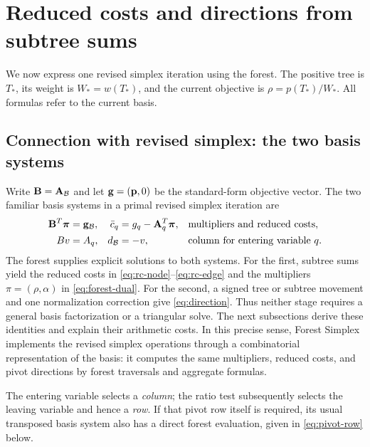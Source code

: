 \section{Reduced costs and directions from subtree sums}\label{sec:directions}

We now express one revised simplex iteration using the forest. The positive
tree is $T_*$, its weight is $W_*=w(T_*)$, and the current objective is
$\rho=p(T_*)/W_*$. All formulas refer to the current basis.

\subsection{Connection with revised simplex: the two basis systems}
Write $\mathbf{B}=\mathbf{A}_{\mathcal B}$ and let $\mathbf{g}=(\mathbf{p},0)$ be the standard-form objective vector.
The two familiar basis systems in a primal revised simplex iteration are
\begin{align}
 \mathbf{B}^T\boldsymbol{\pi}&=\mathbf{g}_{\mathcal B},
 &\bar c_q&=g_q-\mathbf{A}_q^T\boldsymbol{\pi},
 &&\text{multipliers and reduced costs},\label{eq:pricing-system}\\
 Bv&=A_q,
 &d_{\mathcal B}&=-v,
 &&\text{column for entering variable }q.\label{eq:column-system}
\end{align}
The forest supplies explicit solutions to both systems. For the first,
subtree sums yield the reduced costs in \eqref{eq:rc-node}--\eqref{eq:rc-edge}
and the multipliers $\pi=(\rho,\alpha)$ in \eqref{eq:forest-dual}. For the
second, a signed tree or subtree movement and one normalization correction
give \eqref{eq:direction}. Thus neither stage requires a general basis
factorization or a triangular solve. The next subsections derive these
identities and explain their arithmetic costs. In this precise sense, Forest
Simplex implements the revised simplex operations through a combinatorial
representation of the basis: it computes the same multipliers, reduced costs,
and pivot directions by forest traversals and aggregate formulas.

The entering variable selects a \emph{column}; the ratio test subsequently
selects the leaving variable and hence a \emph{row}. If that pivot row itself
is required, its usual transposed basis system also has a direct forest
evaluation, given in \eqref{eq:pivot-row} below.

